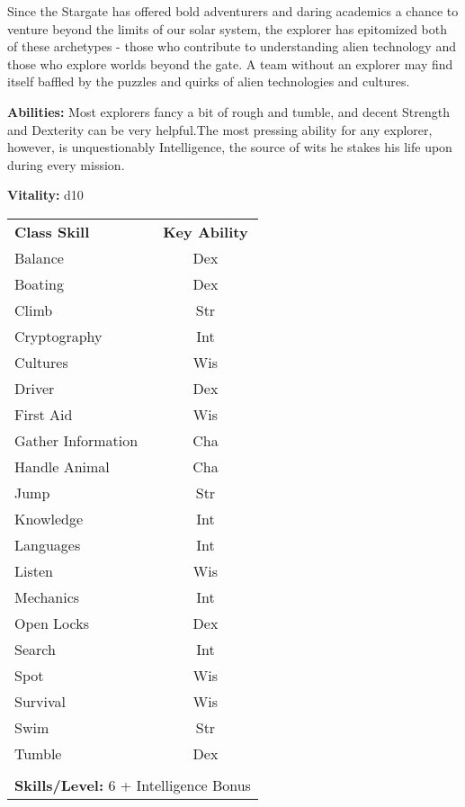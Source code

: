 \begin{multicols}{2}

Since the Stargate has offered bold adventurers and daring academics a chance to venture beyond the limits of our solar system, the explorer has epitomized both of these archetypes - those who contribute to understanding alien technology and those who explore worlds beyond the gate. A team without an explorer may find itself baffled by the puzzles and quirks of alien technologies and cultures.

\columnbreak

\textbf{Abilities:} Most explorers fancy a bit of rough and tumble, and decent Strength and Dexterity can be very helpful.The most pressing ability for any explorer, however, is unquestionably Intelligence, the source of wits he stakes his life upon during every mission.

\textbf{Vitality:} d10

\end{multicols}

\begin{table}[htb]
\raggedright
\begin{tabular}{l c}
\textbf{Class Skill} & \textbf{Key Ability}\\

Balance & Dex\\
Boating & Dex\\
Climb & Str\\
Cryptography & Int\\
Cultures & Wis\\
Driver & Dex\\
First Aid & Wis\\
Gather Information & Cha\\
Handle Animal & Cha\\
Jump & Str\\
Knowledge & Int\\
Languages & Int\\
Listen & Wis\\
Mechanics & Int\\
Open Locks & Dex\\
Search & Int\\
Spot & Wis\\
Survival & Wis\\
Swim & Str\\
Tumble & Dex\\

\multicolumn{2}{l}{\cellcolor{white}}\\
\multicolumn{2}{l}{\cellcolor{white}\textbf{Skills/Level:} 6 + Intelligence Bonus}\\
\end{tabular}
\end{table}

